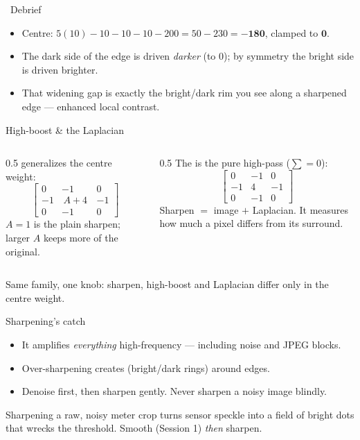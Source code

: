 \documentclass[10pt,aspectratio=169]{beamer}
\begin{document}
\begin{frame}{\faPen~Debrief}
  \begin{itemize}
    \item Centre: $5(10) - 10 - 10 - 10 - 200 = 50 - 230 = \mathbf{-180}$, clamped to $\mathbf{0}$.
    \item The dark side of the edge is driven \emph{darker} (to 0); by symmetry the bright side is driven brighter.
    \item That widening gap is exactly the bright/dark rim you see along a sharpened edge — enhanced local contrast.
  \end{itemize}
\end{frame}

\begin{frame}{High-boost \& the Laplacian}
  \begin{columns}[T]
    \begin{column}{0.5\textwidth}
       generalizes the centre weight:
      \[
      \begin{bmatrix}0&-1&0\\-1&\,A{+}4\,&-1\\0&-1&0\end{bmatrix}
      \]
      $A=1$ is the plain sharpen; larger $A$ keeps more of the original.
    \end{column}
    \begin{column}{0.5\textwidth}
      The  is the pure high-pass ($\sum=0$):
      \[
      \begin{bmatrix}0&-1&0\\-1&4&-1\\0&-1&0\end{bmatrix}
      \]
      Sharpen $=$ image $+$ Laplacian. It measures how much a pixel differs from its surround.
    \end{column}
  \end{columns}
  \begin{infobox}
    Same family, one knob: sharpen, high-boost and Laplacian differ only in the centre weight.
  \end{infobox}
\end{frame}

\begin{frame}{Sharpening's catch}
  \begin{itemize}
    \item It amplifies \emph{everything} high-frequency — including noise and JPEG blocks.
    \item Over-sharpening creates  (bright/dark rings) around edges.
    \item Denoise first, then sharpen gently. Never sharpen a noisy image blindly.
  \end{itemize}
  \begin{badbox}
    Sharpening a raw, noisy meter crop turns sensor speckle into a field of bright dots that
    wrecks the threshold. Smooth (Session 1) \emph{then} sharpen.
  \end{badbox}
\end{frame}
\end{document}
